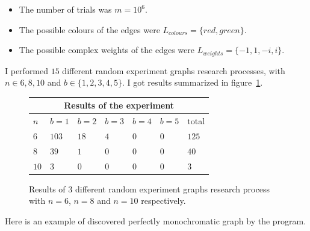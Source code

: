 \begin{itemize}
    \item The number of trials was $m = 10^6$.
    \item The possible colours of the edges were $L_{colours} = \{red, green\}$.
    \item The possible complex weights of the edges were $L_{weights} = \{-1, 1, -i, i\}$.
\end{itemize}

I performed $15$ different random experiment graphs research processes, with $n \in {6, 8, 10}$ and $b \in \{1, 2, 3, 4, 5\}$.
I got results summarized in figure~\ref{fig:results-experiment}.

\begin{figure}[H]
    \centering
    \begin{tabular}{ |p{1cm}||p{1.5cm}|p{1.5cm}|p{1.5cm}|p{1.5cm}|p{1.5cm}|p{1.5cm}|  }
        \hline
        \multicolumn{7}{|c|}{Results of the experiment} \\
        \hline
        $n$ & $b = 1$ & $b = 2$ & $b = 3$ & $b = 4$ & $b = 5$ & total \\
        \hline
        $6 $ & $103$ & $18$ & $4$ & $0$ & $0$ & $125$ \\
        $8 $ & $39$  & $1$  & $0$ & $0$ & $0$ & $40$  \\
        $10$ & $3$   & $0$  & $0$ & $0$ & $0$ & $3$   \\
        \hline
    \end{tabular}
    \caption{Results of $3$ different random experiment graphs research process with $n=6$, $n=8$ and $n=10$ respectively.}
    \label{fig:results-experiment}
\end{figure}

Here is an example of discovered perfectly monochromatic graph by the program.

